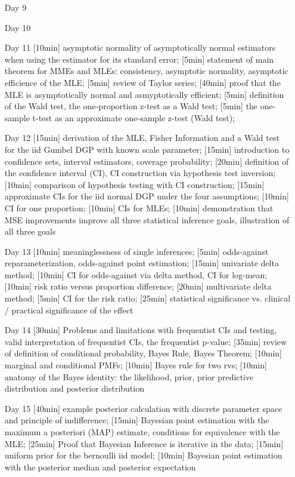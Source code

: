 \begin{enumerate}
\item[Day 9] 
\item[Day 10] 

\item[Day 11] [10min] asymptotic normality of asymptotically normal estimators when using the estimator for its standard error; [5min] statement of main theorem for MMEs and MLEs: consistency, asymptotic normality, asymptotic efficience of the MLE; [5min] review of Taylor series; [40min] proof that the MLE is asymptotically normal and asmyptotically efficient; [5min] definition of the Wald test, the one-proportion z-test as a Wald test; [5min] the one-sample t-test as an approximate one-sample z-test (Wald test);


\item[Day 12] [15min] derivation of the MLE, Fisher Information and a Wald test for the iid Gumbel DGP with known scale parameter; [15min] introduction to confidence sets, interval estimators, coverage probability; [20min] definition of the confidence interval (CI), CI construction via hypothesis test inversion; [10min] comparison of hypothesis testing with CI construction; [15min] approximate CIs for the iid normal DGP under the four assumptions; [10min] CI for one proportion; [10min] CIs for MLEs; [10min] demonstration that MSE improvements improve all three statistical inference goals, illustration of all three goals

\item[Day 13]  [10min] meaninglessness of single inferences; [5min] odds-against reparameterization, odds-against point estimation; [15min] univariate delta method; [10min] CI for odds-against via delta method, CI for log-mean; [10min] risk ratio versus proportion difference; [20min] multivariate delta method; [5min] CI for the risk ratio; [25min] statistical significance vs. clinical / practical significance of the effect

\item[Day 14] [30min] Problems and limitations with frequentist CIs and testing, valid interpretation of frequentist CIs, the frequentist p-value; [35min] review of definition of conditional probability, Bayes Rule, Bayes Theorem; [10min] marginal and conditional PMFs; [10min] Bayes rule for two rvs; [10min] anatomy of the Bayes identity: the likelihood, prior, prior predictive distribution and posterior distribution

\item[Day 15] [40min] example posterior calculation with discrete parameter space and principle of indifference; [15min] Bayesian point estimation with the maximum a posteriori (MAP) estimate, conditions for equivalence with the MLE; [25min] Proof that Bayesian Inference is iterative in the data; [15min] uniform prior for the bernoulli iid model; [10min] Bayesian point estimation with the posterior median and posterior expectation


\end{enumerate}
